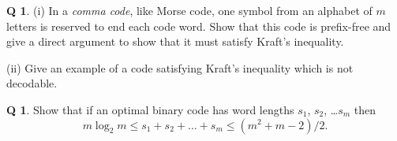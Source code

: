 \documentclass[12pt,a4paper]{article}
\theoremstyle{plain}
\theoremstyle{definition}
\newtheorem{question}[theorem]{Q}
\begin{document}
    \begin{question}
        \label{C1.9}
        (i) In a \emph{comma code}, like
        Morse code, one symbol from an alphabet of $m$ letters
        is reserved to end each code word. Show that
        this code is prefix-free and give a direct
        argument to show that it must satisfy Kraft's inequality.

        (ii) Give an example of a code satisfying Kraft's inequality which
        is not decodable.
    \end{question}
    \begin{question}
        \label{C1.10}
        Show that if an optimal binary code has
        word lengths $s_{1}$, $s_{2}$, \dots $s_{m}$ then
        \[m\log_{2} m\leq s_{1}+s_{2}+\dots+s_{m}\leq (m^{2}+m-2)/2.\]
    \end{question}
\end{document}
